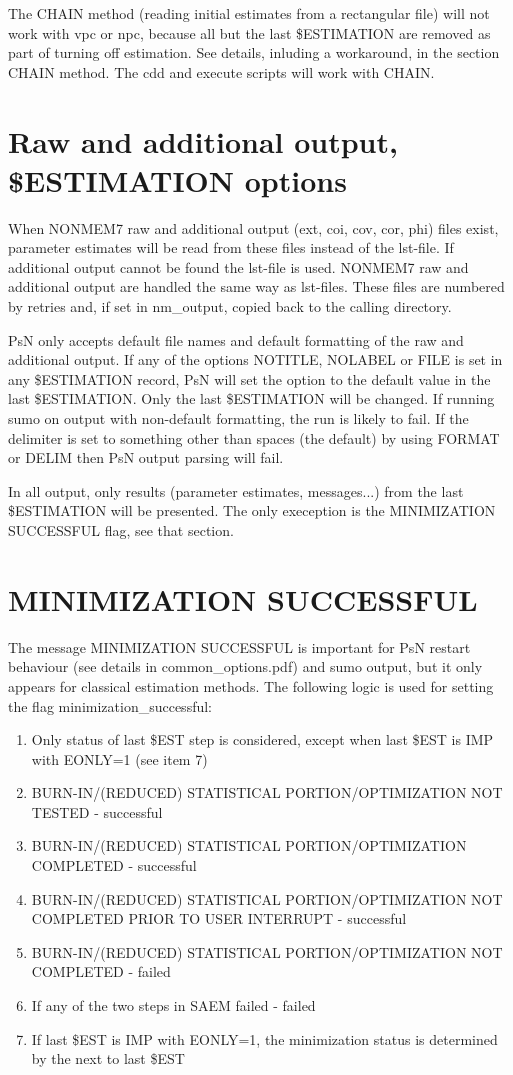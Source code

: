 The CHAIN method (reading initial estimates from a rectangular file) will not work with vpc or npc, because all but the last \$ESTIMATION are removed as part of turning off estimation. See details, inluding a workaround, in the section CHAIN method. The cdd and execute scripts will work with CHAIN.


\section{Raw and additional output, \$ESTIMATION options}

When NONMEM7 raw and additional output (ext, coi, cov, cor, phi) files exist, parameter estimates will be read from these files instead of the lst-file. If additional output cannot be found the lst-file is used. NONMEM7 raw and additional output are handled the same way as lst-files. These files are numbered by retries and, if set in nm\_output, copied back to the calling directory.

PsN only accepts default file names and default formatting of the raw and additional output. If any of the options NOTITLE, NOLABEL or FILE is set in any \$ESTIMATION record, PsN will set the option to the default value in the last \$ESTIMATION. Only the last \$ESTIMATION will be changed. If running sumo on output with non-default formatting, the run is likely to fail. If the delimiter is set to something other than spaces (the default) by using FORMAT or DELIM then PsN output parsing will fail.

In all output, only results (parameter estimates, messages...) from the last \$ESTIMATION will be presented. The only exeception is the MINIMIZATION SUCCESSFUL flag, see that section.

\section{MINIMIZATION SUCCESSFUL}

The message MINIMIZATION SUCCESSFUL is important for PsN restart behaviour (see details in common\_options.pdf) and sumo output, but it only appears for classical estimation methods. The following logic is used for setting the flag minimization\_successful:

\begin{enumerate}
\item Only status of last \$EST step is considered, except when last \$EST is IMP with EONLY=1 (see item 7)
\item BURN-IN/(REDUCED) STATISTICAL PORTION/OPTIMIZATION NOT TESTED - successful
\item BURN-IN/(REDUCED) STATISTICAL PORTION/OPTIMIZATION COMPLETED - successful
\item BURN-IN/(REDUCED) STATISTICAL PORTION/OPTIMIZATION NOT COMPLETED PRIOR TO USER INTERRUPT - successful
\item BURN-IN/(REDUCED) STATISTICAL PORTION/OPTIMIZATION NOT COMPLETED - failed
\item If any of the two steps in SAEM failed - failed 
\item If last \$EST is IMP with EONLY=1, the minimization status is determined by the next to last \$EST
\end{enumerate}

